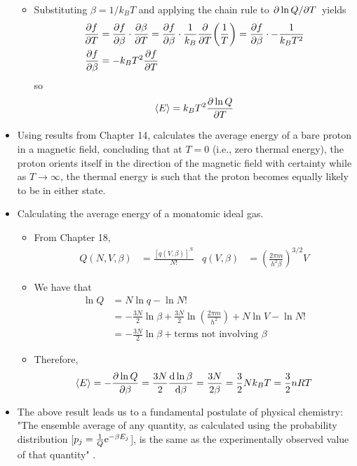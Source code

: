 \documentclass[../notes.tex]{subfiles}
\begin{document}
\begin{itemize}
\begin{itemize}
        \item Substituting $\beta=1/k_BT$ and applying the chain rule to $\pdv*{\ln Q}{T}$ yields
        \begin{align*}
            \pdv{f}{T} &= \pdv{f}{\beta}\cdot\pdv{\beta}{T}
            = \pdv{f}{\beta}\cdot\frac{1}{k_B}\pdv{T}(\frac{1}{T})
            = \pdv{f}{\beta}\cdot-\frac{1}{k_BT^2}\\
            \pdv{f}{\beta} &= -k_BT^2\pdv{f}{T}
        \end{align*}
        so
        \begin{equation*}
            \prb{E} = k_BT^2\pdv{\ln Q}{T}
        \end{equation*}
    \end{itemize}
    \item Using results from Chapter 14, \textcite{bib:McQuarrieSimon} calculates the average energy of a bare proton in a magnetic field, concluding that at $T=0$ (i.e., zero thermal energy), the proton orients itself in the direction of the magnetic field with certainty while as $T\to\infty$, the thermal energy is such that the proton becomes equally likely to be in either state.
    \item Calculating the average energy of a monatomic ideal gas.
    \begin{itemize}
        \item From Chapter 18,
        \begin{align*}
            Q(N,V,\beta) &= \frac{[q(V,\beta)]^N}{N!}&
            q(V,\beta) &= \left( \frac{2\pi m}{h^2\beta} \right)^{3/2}V
        \end{align*}
        \item We have that
        \begin{align*}
            \ln Q &= N\ln q-\ln N!\\
            &= -\frac{3N}{2}\ln\beta+\frac{3N}{2}\ln\left( \frac{2\pi m}{h^2} \right)+N\ln V-\ln N!\\
            &= -\frac{3N}{2}\ln\beta+\text{terms not involving }\beta
        \end{align*}
        \item Therefore,
        \begin{equation*}
            \prb{E} = -\pdv{\ln Q}{\beta} = \frac{3N}{2}\dv{\ln\beta}{\beta} = \frac{3N}{2\beta} = \frac{3}{2}Nk_BT = \frac{3}{2}nRT
        \end{equation*}
    \end{itemize}
    \item The above result leads us to a fundamental postulate of physical chemistry: "The ensemble average of any quantity, as calculated using the probability distribution [$p_j=\frac{1}{Q}\e[-\beta E_j]$], is the same as the experimentally observed value of that quantity" \parencite[700]{bib:McQuarrieSimon}.

\end{itemize}
\end{document}
